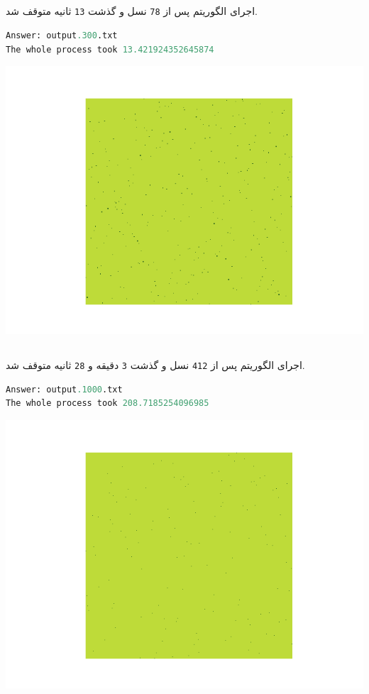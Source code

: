 \documentclass[a4paper, 12pt]{article}
\theoremstyle{definition}
\begin{document}
\subsection{}

اجرای الگوریتم پس از
\texttt{78}
نسل و گذشت
\texttt{13}
ثانیه متوقف شد.

\LTR
\begin{lstlisting}[language=Python]
Answer: output.300.txt
The whole process took 13.421924352645874
\end{lstlisting}
\RTL

\begin{center}
    \includegraphics[width=.7\textwidth]{output.300.png}
\end{center}

\subsection{}

اجرای الگوریتم پس از
\texttt{412}
نسل و گذشت
\texttt{3}
دقیقه و
\texttt{28}
ثانیه متوقف شد.

\LTR
\begin{lstlisting}[language=Python]
Answer: output.1000.txt
The whole process took 208.7185254096985    
\end{lstlisting}
\RTL

\begin{center}
    \includegraphics[width=.7\textwidth]{output.1000.png}
\end{center}
\end{document}
